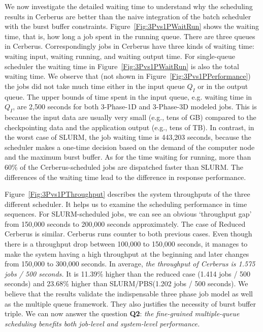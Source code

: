 We now investigate the detailed waiting time to understand why the scheduling results in Cerberus
are better than the naive integration of the batch scheduler with the burst buffer constraints.
Figure~\ref{Fig:3Pvs1PWaitRun} shows the waiting time, that is, how long a job spent in the running queue.
There are three queues in Cerberus.
Correspondingly jobs in Cerberus have three kinds of waiting time: waiting input, waiting running, and waiting output time.
For single-queue scheduler the waiting time in Figure~\ref{Fig:3Pvs1PWaitRun} is also the total waiting time.
We observe that (not shown in Figure~\ref{Fig:3Pvs1PPerformance}) the jobs did not
take much time either in the input queue $Q_I$ or in the output queue.
The upper bounds of time spent in the input queue, e.g. waiting time in $Q_I$, are 
2,500 seconds for both 3-Phase-1D and 3-Phase-3D modeled jobs.
This is because the input data are usually very small (e.g., tens of GB)
compared to the checkpointing data and the application output (e.g., tens of TB).
In contrast, in the worst case of SLURM, the job waiting time is 443,203 seconds,
because the scheduler makes a one-time decision based on the demand of the computer node and the maximum burst buffer.
As for the time waiting for running, more than 60\% of the Cerberus-scheduled jobs are dispatched faster than SLURM.
The differences of the waiting time lead to the difference in response performance.

Figure~\ref{Fig:3Pvs1PThroughput} describes the system throughputs of the three different scheduler.
It helps us to examine the scheduling performance in time sequences.
For SLURM-scheduled jobs, we can see an obvious `throughput gap'
from 150,000 seconds to 200,000 seconds approximately.
The case of Reduced Cerberus is similar.
Cerberus runs counter to both previous cases.
Even though there is a throughput drop between 100,000 to 150,000 seconds,
it manages to make the system having a high throughput at the beginning and
later changes from 150,000 to 300,000 seconds.
In average, \textit{the throughput of Cerberus is 1.575 jobs / 500 seconds.}
It is 11.39\% higher than the reduced case (1.414 jobs / 500 seconds) and
23.68\% higher than SLURM/PBS(1.202 jobs / 500 seconds).
We believe that the results validate the indispensable three phase job model as well as
the multiple queue framework.
They also justifies the necessity of burst buffer triple.
We can now answer the question \textbf{Q2}:
\textit{the fine-grained multiple-queue scheduling benefits both job-level and system-level performance.}

